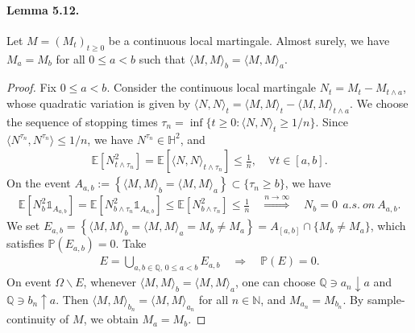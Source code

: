 \documentclass{article}
\numberwithin{equation}{section}
\newcommand{\E}{\mathbb{E}}
\renewcommand{\P}{\mathbb{P}}
\theoremstyle{plain}
\theoremstyle{definition}
\begin{document}
\paragraph{Lemma 5.12.\label{lemma:5.12}} Let $M=(M_t)_{t\geq 0}$ be a continuous local martingale. Almost surely, we have $M_a=M_b$ for all $0\leq a<b$ such that $\langle M,M\rangle_b=\langle M,M\rangle_a$.
\begin{proof}
Fix $0\leq a<b$. Consider the continuous local martingale $N_t=M_t-M_{t\wedge a}$, whose quadratic variation is given by $\langle N,N\rangle_t=\langle M,M\rangle_t-\langle M,M\rangle_{t\wedge a}$. We choose the sequence of stopping times $\tau_n=\inf\{t\geq 0:\langle N,N\rangle_t\geq 1/n\}$. Since $\langle N^{\tau_n},N^{\tau_n}\rangle\leq 1/n$, we have $N^{\tau_n}\in\mathbb{H}^2$, and
\begin{align*}
	\E\left[N_{t\wedge\tau_n}^2\right] = \E\left[\langle N,N\rangle_{t\wedge\tau_n}\right]\leq\frac{1}{n},\quad\forall t\in[a,b].
\end{align*}
On the event $A_{a,b}:=\left\{\langle M,M\rangle_b=\langle M,M\rangle_a\right\}\subset\{\tau_n\geq b\}$, we have
\begin{align*}
	\E\left[N_b^2\mathds{1}_{A_{a,b}}\right] = \E\left[N_{b\wedge\tau_n}^2\mathds{1}_{A_{a,b}}\right]\leq\E\left[N_{b\wedge\tau_n}^2\right]\leq\frac{1}{n} \quad\overset{n\to\infty}{\Rightarrow}\quad N_b=0\ \ a.s.\ on\ A_{a,b}.
\end{align*}
We set $E_{a,b}=\left\{\langle M,M\rangle_b=\langle M,M\rangle_a=M_b\neq M_a\right\}=A_{[a,b]}\cap\{M_b\neq M_a\}$, which satisfies $\P(E_{a,b})=0$. Take
\begin{align*}
	E=\bigcup_{a,b\in\mathbb{Q},\,0\leq a<b}E_{a,b}\quad\Rightarrow\quad \P(E)=0.
\end{align*}
On event $\Omega\backslash E$, whenever $\langle M,M\rangle_b=\langle M,M\rangle_a$, one can choose $\mathbb{Q}\ni a_n\downarrow a$ and $\mathbb{Q}\ni b_n\uparrow a$. Then $\langle M,M\rangle_{b_n}=\langle M,M\rangle_{a_n}$ for all $n\in\mathbb{N}$, and $M_{a_n}=M_{b_n}$. By sample-continuity of $M$, we obtain $M_a=M_b$.
\end{proof}
\end{document}
